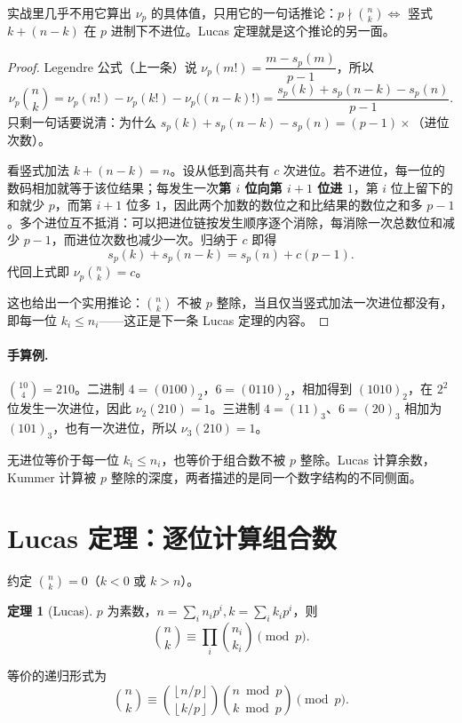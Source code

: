 \documentclass[UTF8,a4paper,11pt,twoside,openright,fontset=fandol]{ctexbook}
\theoremstyle{definition}
\newtheorem{theorem}[definition]{定理}
\newcommand{\floor}[1]{\left\lfloor #1\right\rfloor}
\begin{document}
\begin{tip}
实战里几乎不用它算出 $\nu_p$ 的具体值，只用它的一句话推论：$p\nmid\binom nk\iff$ 竖式 $k+(n-k)$ 在 $p$ 进制下不进位。Lucas 定理就是这个推论的另一面。
\end{tip}


\begin{proof}
Legendre 公式（上一条）说 $\nu_p(m!)=\dfrac{m-s_p(m)}{p-1}$，所以
\[
 \nu_p\binom{n}{k}=\nu_p(n!)-\nu_p(k!)-\nu_p\big((n-k)!\big)
 =\frac{s_p(k)+s_p(n-k)-s_p(n)}{p-1}.
\]
只剩一句话要说清：为什么 $s_p(k)+s_p(n-k)-s_p(n)=(p-1)\times$（进位次数）。

看竖式加法 $k+(n-k)=n$。设从低到高共有 $c$ 次进位。若不进位，每一位的数码相加就等于该位结果；每发生一次\textbf{第 $i$ 位向第 $i+1$ 位进 $1$}，第 $i$ 位上留下的和就少 $p$，而第 $i+1$ 位多 $1$，因此两个加数的数位之和比结果的数位之和多 $p-1$。多个进位互不抵消：可以把进位链按发生顺序逐个消除，每消除一次总数位和减少 $p-1$，而进位次数也减少一次。归纳于 $c$ 即得
\[
 s_p(k)+s_p(n-k)=s_p(n)+c(p-1).
\]
代回上式即 $\nu_p\binom nk=c$。

这也给出一个实用推论：$\binom nk$ 不被 $p$ 整除，当且仅当竖式加法一次进位都没有，即每一位 $k_i\le n_i$——这正是下一条 Lucas 定理的内容。
\end{proof}
\paragraph{手算例.} $\binom{10}{4}=210$。二进制 $4=(0100)_2$，$6=(0110)_2$，相加得到 $(1010)_2$，在 $2^2$ 位发生一次进位，因此 $\nu_2(210)=1$。三进制 $4=(11)_3$、$6=(20)_3$ 相加为 $(101)_3$，也有一次进位，所以 $\nu_3(210)=1$。
\begin{teach}
无进位等价于每一位 $k_i\le n_i$，也等价于组合数不被 $p$ 整除。Lucas 计算余数，Kummer 计算被 $p$ 整除的深度，两者描述的是同一个数字结构的不同侧面。
\end{teach}


\section{Lucas 定理：逐位计算组合数}
约定 $\binom nk=0$（$k<0$ 或 $k>n$）。
\begin{theorem}[Lucas]
$p$ 为素数，$n=\sum_i n_ip^i,k=\sum_i k_ip^i$，则
\[
 \binom nk\equiv\prod_i\binom{n_i}{k_i}\pmod p.
\]


等价的递归形式为
\[
 \binom nk\equiv\binom{\floor{n/p}}{\floor{k/p}}
 \binom{n\bmod p}{k\bmod p}\pmod p.
\]
\end{theorem}
\end{document}
